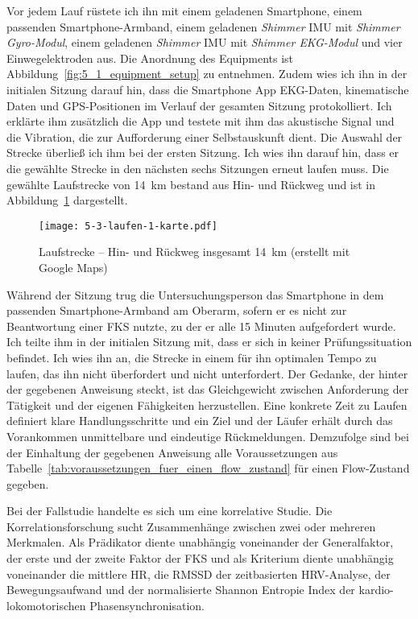 Vor jedem Lauf rüstete ich ihn mit einem geladenen Smartphone, einem passenden Smartphone-Armband, einem geladenen \emph{Shimmer} \ac{IMU} mit \emph{Shimmer Gyro-Modul}, einem geladenen \emph{Shimmer} \ac{IMU} mit \emph{Shimmer EKG-Modul} und vier Einwegelektroden aus. Die Anordnung des Equipments ist Abbildung~\ref{fig:5_1_equipment_setup} zu entnehmen. Zudem wies ich ihn in der initialen Sitzung darauf hin, dass die Smartphone App \ac{EKG}-Daten, kinematische Daten und \ac{GPS}-Positionen im Verlauf der gesamten Sitzung protokolliert. Ich erklärte ihm zusätzlich die App und testete mit ihm das akustische Signal und die Vibration, die zur Aufforderung einer Selbstauskunft dient. Die Auswahl der Strecke überließ ich ihm bei der ersten Sitzung. Ich wies ihn darauf hin, dass er die gewählte Strecke in den nächsten sechs Sitzungen erneut laufen muss. Die gewählte Laufstrecke von 14~km bestand aus Hin- und Rückweg und ist in Abbildung~\ref{fig:5_3_laufen_1_karte} dargestellt.

\begin{figure}[t]
	\centering
		\texttt{[image: 5-3-laufen-1-karte.pdf]}
	\caption[Laufstrecke -- Hin- und Rückweg]{Laufstrecke -- Hin- und Rückweg insgesamt 14~km (erstellt mit Google Maps)}
	\label{fig:5_3_laufen_1_karte}
\end{figure}

Während der Sitzung trug die Untersuchungsperson das Smartphone in dem passenden Smartphone-Armband am Oberarm, sofern er es nicht zur Beantwortung einer \ac{FKS} nutzte, zu der er alle 15 Minuten aufgefordert wurde. Ich teilte ihm in der initialen Sitzung mit, dass er sich in keiner Prüfungssituation befindet. Ich wies ihn an, die Strecke in einem für ihn optimalen Tempo zu laufen, das ihn nicht überfordert und nicht unterfordert. Der Gedanke, der hinter der gegebenen Anweisung steckt, ist das Gleichgewicht zwischen Anforderung der Tätigkeit und der eigenen Fähigkeiten herzustellen. Eine konkrete Zeit zu Laufen definiert klare Handlungsschritte und ein Ziel und der Läufer erhält durch das Vorankommen unmittelbare und eindeutige Rückmeldungen. Demzufolge sind bei der Einhaltung der gegebenen Anweisung alle Voraussetzungen aus Tabelle~\ref{tab:voraussetzungen_fuer_einen_flow_zustand} für einen Flow-Zustand gegeben.

Bei der Fallstudie handelte es sich um eine korrelative Studie. Die Korrelationsforschung sucht Zusammenhänge zwischen zwei oder mehreren Merkmalen. Als Prädikator diente unabhängig voneinander der Generalfaktor, der erste und der zweite Faktor der \ac{FKS} und als Kriterium diente unabhängig voneinander die mittlere \ac{HR}, die \acs{RMSSD} der zeitbasierten \ac{HRV}-Analyse, der Bewegungsaufwand und der normalisierte Shannon Entropie Index der kardio-lokomotorischen Phasensynchronisation.

